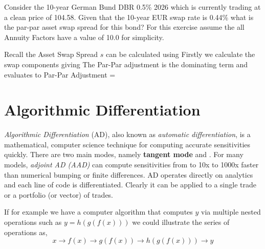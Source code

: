\documentclass[12pt,a4paper]{article}
\begin{document}
\begin{question}
	Consider the 10-year German Bund DBR 0.5\% 2026 which is currently trading at a clean price of 104.58. 
	Given that the 10-year EUR swap rate is 0.44\% what is the par-par asset swap spread for this bond? 
	For this exercise assume the all Annuity Factors have a value of 10.0 for simplicity.
\end{question}
Recall the Asset Swap Spread $s$ can be calculated using 
Firstly we calculate the swap components giving 
The Par-Par adjustment is the dominating term and evaluates to
Par-Par Adjustment =

%
%





\clearpage
\section{Algorithmic Differentiation}

\emph{Algorithmic Differentiation} (AD), also known as \emph{automatic differentiation}, is a mathematical, computer science technique for computing accurate sensitivities quickly. There are two main modes, namely \textbf{tangent mode} and . For many models, \emph{adjoint AD (AAD)} can compute sensitivities from to 10x to 1000x faster than numerical bumping or finite differences. AD operates directly on analytics and each line of code is differentiated. Clearly it can be applied to a single trade or a portfolio (or vector) of trades.

If for example we have a computer algorithm that computes $y$ via multiple nested operations such as $y = h(g(f(x)))$ we could illustrate the series of operations as,
\begin{equation}
x\rightarrow f(x) \rightarrow g(f(x)) \rightarrow h(g(f(x))) \rightarrow y
\end{equation}
\end{document}
